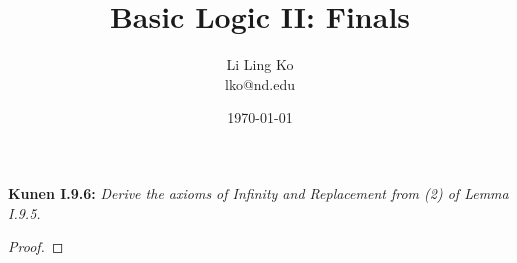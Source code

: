 \documentclass{article}
\begin{document}
\title{Basic Logic II: Finals}
\author{Li Ling Ko\\ lko@nd.edu}
\date{\today}
\maketitle

\textbf{Kunen I.9.6:} \it Derive the axioms of Infinity and Replacement
  from (2) of Lemma I.9.5.

  \begin{proof}
  \end{proof}
\end{document}

